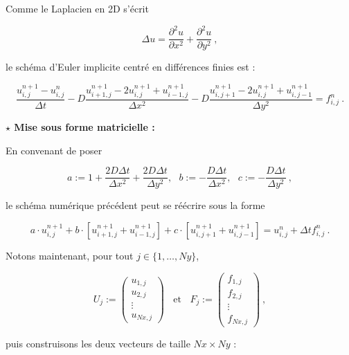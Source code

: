 \documentclass[11pt]{article}
\begin{document}
\noindent
Comme le Laplacien en 2D s'écrit

$$\Delta u = \frac{\partial^2 u}{\partial x^2} + \frac{\partial^2 u}{\partial y^2}~,$$

\vspace{5 mm}

\noindent
le schéma d'Euler implicite centré en différences finies est :

$$\frac{u^{n+1}_{i,j} - u^n_{i,j}}{\Delta t} - D \frac{u^{n+1}_{i+1,j} - 2u^{n+1}_{i,j} + u^{n+1}_{i-1,j}}{\Delta x^2} - D \frac{u^{n+1}_{i,j+1} - 2u^{n+1}_{i,j} + u^{n+1}_{i,j-1}}{\Delta y^2} = f^n_{i,j}~.$$

\vspace{5 mm}

\noindent
\textbf{$\star$ Mise sous forme matricielle :}

\vspace{5 mm}

\noindent
En convenant de poser

$$a := 1 + \frac{2D\Delta t}{\Delta x^2} + \frac{2D\Delta t}{\Delta y^2},~~~ b:= -\frac{D\Delta t}{\Delta x^2},~~~ c:= -\frac{D\Delta t}{\Delta y^2}~,$$

\vspace{5 mm}

\noindent
le schéma numérique précédent peut se réécrire sous la forme

$$a \cdot u^{n+1}_{i,j} + b \cdot [u^{n+1}_{i+1,j} + u^{n+1}_{i-1,j}] + c \cdot [u^{n+1}_{i,j+1} + u^{n+1}_{i,j-1}] = u^n_{i,j} + \Delta t f^n_{i,j}~.$$

\vspace{5 mm}

\noindent
Notons maintenant, pour tout $j \in \{1, \ldots, Ny \}$,

$$U_j := \begin{pmatrix}
	u_{1,j} \\
	u_{2,j} \\
	\vdots \\
	u_{Nx,j}
\end{pmatrix}~~~~\text{et}~~~~F_j := \begin{pmatrix}
	f_{1,j} \\
	f_{2,j} \\
	\vdots \\
	f_{Nx,j}
\end{pmatrix}~,$$

\vspace{5 mm}

\noindent
puis construisons les deux vecteurs de taille $Nx \times Ny$ :
\end{document}
